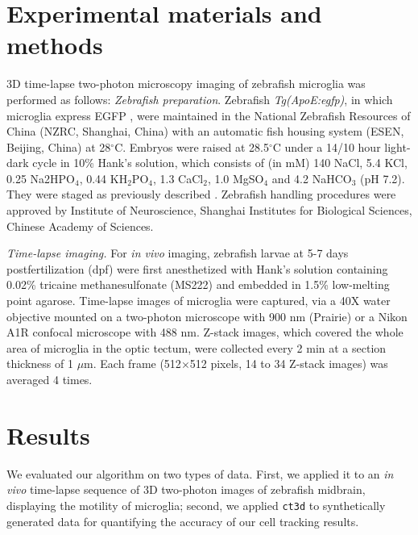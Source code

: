 \section{Experimental materials and methods}

3D time-lapse two-photon microscopy imaging of zebrafish microglia was
performed as follows: \emph{Zebrafish preparation}. Zebrafish
\emph{Tg(ApoE:egfp)}, in which microglia express EGFP \cite{Peri:08},
were maintained in the National Zebrafish Resources of China (NZRC,
Shanghai, China) with an automatic fish housing system (ESEN, Beijing,
China) at 28$^{\circ}$C. Embryos were raised at 28.5$^{\circ}$C under
a 14/10 hour light-dark cycle in 10\% Hank’s solution, which consists
of (in mM) 140 NaCl, 5.4 KCl, 0.25 Na2HPO$_4$, 0.44 KH$_2$PO$_4$, 1.3
CaCl$_2$, 1.0 MgSO$_4$ and 4.2 NaHCO$_3$ (pH 7.2). They were staged as
previously described \cite{Kimmel:95}. Zebrafish handling procedures
were approved by Institute of Neuroscience, Shanghai Institutes for
Biological Sciences, Chinese Academy of Sciences.

\emph{Time-lapse imaging.} For \textit{in vivo} imaging, zebrafish
larvae at 5-7 days postfertilization (dpf) were first anesthetized
with Hank’s solution containing 0.02\% tricaine methanesulfonate
(MS222) and embedded in 1.5\% low-melting point agarose. Time-lapse
images of microglia were captured, via a 40X water objective mounted
on a two-photon microscope with 900 nm (Prairie) or a Nikon A1R
confocal microscope with 488 nm. Z-stack images, which covered the
whole area of microglia in the optic tectum, were collected every 2
min at a section thickness of 1 $\mu$m. Each frame (512$\times$512
pixels, 14 to 34 Z-stack images) was averaged 4
times.

\section{Results}
\label{sect:results}

We evaluated our algorithm on two types of data. First,
   we applied it to an \textit{in vivo} time-lapse sequence of 3D
   two-photon images of zebrafish midbrain, displaying the motility of
   microglia; second, we applied \texttt{ct3d} to synthetically
   generated data for quantifying the accuracy of our cell tracking
   results.


